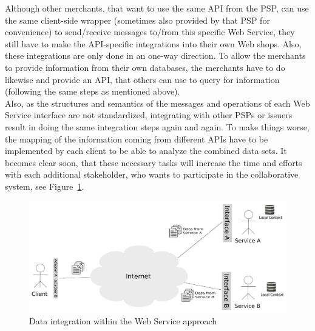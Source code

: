 Although other merchants, that want to use the same \gls{API} from the \gls{PSP}, can use the same client-side wrapper (sometimes also provided by that \gls{PSP} for convenience) to send/receive messages to/from this specific Web Service, they still have to make the \gls{API}-specific integrations into their own Web shops. Also, these integrations are only done in an one-way direction. To allow the merchants to provide information from their own databases, the merchants have to do likewise and provide an \gls{API}, that others can use to query for information (following the same steps as mentioned above). \\

Also, as the structures and semantics of the messages and operations of each Web Service interface are not standardized, integrating with other \gls{PSP}s or issuers result in doing the same integration steps again and again. To make things worse, the mapping of the information coming from different \gls{API}s have to be implemented by each client to be able to analyze the combined data sets. It becomes clear soon, that these necessary tasks will increase the time and efforts with each additional stakeholder, who wants to participate in the collaborative system, see Figure~\ref{fig:web_services_scenario}. \@

\begin{figure}[H]
  \centering
  \includegraphics[width=0.9\columnwidth]{images/web-services-scenario.pdf}
  \caption{Data integration within the Web Service approach}
\label{fig:web_services_scenario}
\end{figure}


